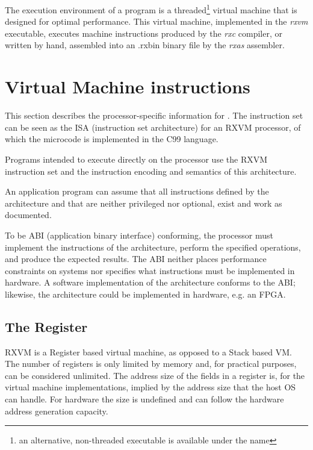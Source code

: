 The execution environment of a \crexx{} program is a
threaded\footnote{an alternative, non-threaded executable is available
  under the \emph{} name} virtual
machine that is designed for optimal performance. This virtual
machine, implemented in the \emph{rxvm} executable, executes
machine instructions produced by the \emph{rxc} \crexx{}
compiler, or written by hand, assembled into an .rxbin binary file by
the \emph{rxas} assembler.



\section{\crexx{} Virtual Machine instructions}

This section describes the processor-specific information for
. The instruction set can be seen as the ISA
(instruction set architecture) for
an RXVM processor, of which the microcode is implemented in the C99 language.

Programs intended to execute directly on the processor use the
RXVM instruction set and the
instruction encoding and semantics of this architecture.

An application program can assume that all instructions defined by the
architecture and that are neither privileged nor optional, exist and work
as documented.

To be ABI (application binary interface) conforming, the processor must implement the instructions of
the architecture, perform the specified operations, and produce the
expected results.  The ABI neither places performance constraints on
systems nor specifies what instructions must be implemented in
hardware.  A software implementation of the architecture conforms to
the ABI; likewise, the architecture could be implemented in hardware,
e.g. an FPGA.

\subsection{The Register}
RXVM is a Register based virtual machine, as opposed to a Stack based
VM. The number of registers is only limited by memory and, for
practical purposes, can be considered unlimited. The address size of
the fields in a register is, for the virtual machine implementations,
implied by the address size that the host OS can handle. For hardware
the size is undefined and can follow the hardware address generation
capacity.

